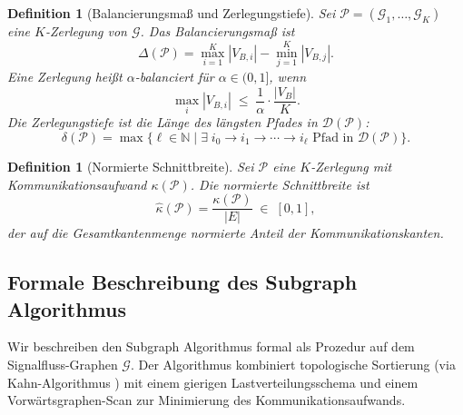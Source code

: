 ﻿\documentclass[12pt,a4paper]{article}
\newtheorem{definition}[theorem]{Definition}
\theoremstyle{definition}
\begin{document}
\begin{definition}[Balancierungsmaß und Zerlegungstiefe]
\label{def:balance}
Sei $\mathcal{P} = (\mathcal{G}_1, \ldots, \mathcal{G}_K)$ eine $K$-Zerlegung
von $\mathcal{G}$. Das \emph{Balancierungsmaß} ist
\[
  \Delta(\mathcal{P}) = \max_{i=1}^K |V_{B,i}| - \min_{j=1}^K |V_{B,j}|.
\]
Eine Zerlegung heißt \emph{$\alpha$-balanciert} für $\alpha \in (0,1]$, wenn
\[
  \max_{i} |V_{B,i}| \;\leq\; \frac{1}{\alpha} \cdot \frac{|V_B|}{K}.
\]
Die \emph{Zerlegungstiefe} ist die Länge des längsten Pfades in
$\mathcal{D}(\mathcal{P})$:
\[
  \delta(\mathcal{P}) = \max\bigl\{\ell \in \mathbb{N} \;\big|\;
    \exists\; i_0 \to i_1 \to \cdots \to i_\ell
    \text{ Pfad in } \mathcal{D}(\mathcal{P})\bigr\}.
\]
\end{definition}

\begin{definition}[Normierte Schnittbreite]
\label{def:edgecut}
Sei $\mathcal{P}$ eine $K$-Zerlegung mit Kommunikationsaufwand $\kappa(\mathcal{P})$.
Die \emph{normierte Schnittbreite} ist
\[
  \hat{\kappa}(\mathcal{P}) = \frac{\kappa(\mathcal{P})}{|E|} \;\in\; [0,1],
\]
der auf die Gesamtkantenmenge normierte Anteil der Kommunikationskanten.
\end{definition}

\subsection{Formale Beschreibung des Subgraph Algorithmus}
\label{subsec:subgraph-alg}

Wir beschreiben den Subgraph Algorithmus \cite{subgraph2026} formal als
Prozedur auf dem Signalfluss-Graphen $\mathcal{G}$. Der Algorithmus
kombiniert topologische Sortierung (via Kahn-Algorithmus \cite{kahn1962})
mit einem gierigen Lastverteilungsschema und einem Vorwärtsgraphen-Scan
zur Minimierung des Kommunikationsaufwands.
\end{document}
